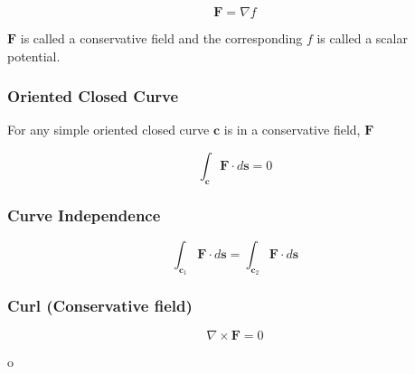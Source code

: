 \documentclass[11pt, oneside]{article}
\renewcommand{\vec}[1]{\mathbf{#1}}
\begin{document}
\begin{equation}
  \vec{F} = \nabla f
\end{equation}

$\vec{F}$ is called a conservative field and the corresponding $f$ is called a scalar potential.

\subsubsection{Oriented Closed Curve}

For any simple oriented closed curve $\vec{c}$ is in a conservative field, $\vec{F}$

\begin{equation}
  \int_{\vec{c}}\vec{F}\cdot d\vec{s} = 0 
\end{equation}

\subsubsection{Curve Independence}
\begin{equation}
  \int_{\vec{c}_1}\vec{F}\cdot d\vec{s} = \int_{\vec{c}_2}\vec{F}\cdot d\vec{s}
\end{equation}

\subsubsection{Curl (Conservative field)}

\begin{equation}
  \nabla\times\vec{F}=0
\end{equation}

o
\end{document}
